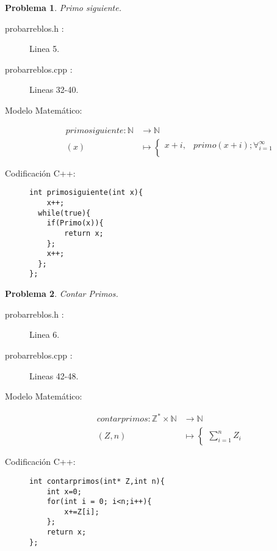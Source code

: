 \documentclass{article}
\theoremstyle{plain}
\theoremstyle{definition}
\newtheorem{problem}{Problema}
\begin{document}
\begin{problem} \emph{Primo siguiente.}\\
\begin{description}
\item[probarreblos.h :] Linea 5. \item[probarreblos.cpp :] Lineas 32-40.

\item[Modelo Matemático:]
\begin{align*}
primosiguiente: \mathbb{N} &\to \mathbb{N}\\
(x) &\mapsto
\begin{cases}
 x+i,& primo(x+i);\forall_{i=1}^{\infty}\\
\end{cases}
\end{align*}
%
\item[Codificación \textsf{C++}:]\hfill
%
\begin{verbatim}
int primosiguiente(int x){
    x++;
  while(true){
    if(Primo(x)){
        return x;
    };
    x++;
  };
};
\end{verbatim}
\end{description}
\end{problem}

\begin{problem} \emph{Contar Primos.}\\
\begin{description}
\item[probarreblos.h :] Linea 6. \item[probarreblos.cpp :] Lineas 42-48.

\item[Modelo Matemático:]
\begin{align*}
contarprimos: \mathbb{Z}^{*}\times\mathbb{N} &\to \mathbb{N}\\
(Z,n) &\mapsto
\begin{cases}
\sum_{i=1}^{n}Z_{i}
\end{cases}
\end{align*}
%
\item[Codificación \textsf{C++}:]\hfill
%
\begin{verbatim}
int contarprimos(int* Z,int n){
    int x=0;
    for(int i = 0; i<n;i++){
        x+=Z[i];
    };
    return x;
};
\end{verbatim}
\end{description}
\end{problem}
\end{document}
